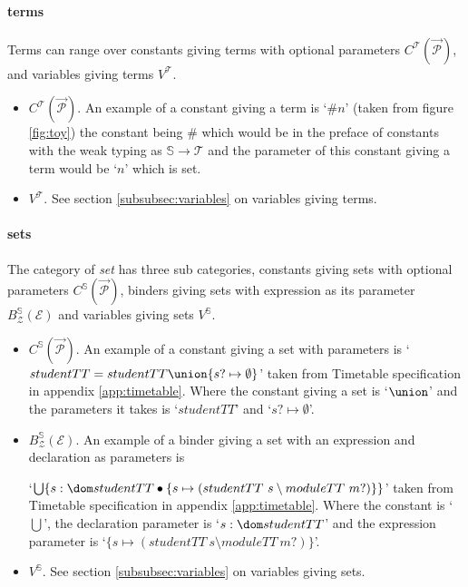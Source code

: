 \paragraph{terms}
\label{subsubsec:terms}

Terms can range over constants giving terms with optional parameters
$C^{\mathcal{T}}(\overrightarrow{\mathcal{P}})$, and variables giving terms
$V^{\mathcal{T}}$.

\begin{itemize}
\item $C^{\mathcal{T}}(\overrightarrow{\mathcal{P}})$. An example of a constant
giving a term is `$\# n$' (taken from figure \ref{fig:toy}) the constant being
$\#$ which would be in the preface of constants with the weak typing as
$\mathbb{S} \rightarrow \mathcal{T}$ and the parameter of this constant giving a
term would be `$n$' which is set.

\item $V^{\mathcal{T}}$. See section \ref{subsubsec:variables} on variables
giving terms.
\end{itemize}

\paragraph{sets}
\label{subsubsec:sets}

The category of \emph{set} has three sub categories, constants giving sets with
optional parameters $C^{\mathbb{S}}(\overrightarrow{\mathcal{P}})$, binders
giving sets with expression as its parameter
$B^{\mathbb{S}}_{\mathcal{Z}}(\mathcal{E})$ and variables giving sets
$V^{\mathbb{S}}$.

\begin{itemize}
\item $C^{\mathbb{S}}(\overrightarrow{\mathcal{P}})$. An example of a constant
giving a set with parameters is
\newline
`$studentTT = studentTT \union {s? \mapsto \emptyset}$'
\newline
taken from Timetable specification in appendix \ref{app:timetable}. Where the
constant giving a set is `$\union$' and the parameters it takes is `$studentTT$'
and `${s? \mapsto \emptyset}$'.

\item $B^{\mathbb{S}}_{\mathcal{Z}}(\mathcal{E})$. An example of a binder giving
a set with an expression and declaration as parameters is
\newline

`$\bigcup \{s:\dom studentTT \bullet \{s \mapsto (studentTT~s \setminus
moduleTT~m?)\}\}$' \newline
taken from Timetable specification in appendix \ref{app:timetable}. Where the
constant is `$\bigcup$', the declaration parameter is `$s:\dom studentTT $' and
the expression parameter is `$  \{s \mapsto (studentTT~s \setminus
moduleTT~m?)\}$'.

\item $V^{\mathbb{S}}$. See section \ref{subsubsec:variables} on variables
giving sets.
\end{itemize}

